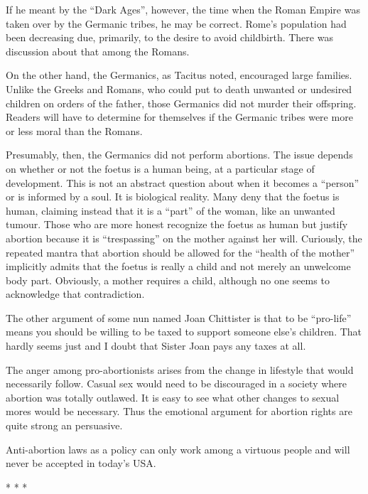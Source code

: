 If he meant by the ``Dark Ages'', however, the time when the Roman Empire was taken over by the Germanic tribes, he may be correct. Rome's population had been decreasing due, primarily, to the desire to avoid childbirth. There was discussion about that among the Romans.

On the other hand, the Germanics, as Tacitus noted, encouraged large families. Unlike the Greeks and Romans, who could put to death unwanted or undesired children on orders of the father, those Germanics did not murder their offspring. Readers will have to determine for themselves if the Germanic tribes were more or less moral than the Romans.

Presumably, then, the Germanics did not perform abortions. The issue depends on whether or not the foetus is a human being, at a particular stage of development. This is not an abstract question about when it becomes a ``person'' or is informed by a soul. It is biological reality. Many deny that the foetus is human, claiming instead that it is a ``part'' of the woman, like an unwanted tumour. Those who are more honest recognize the foetus as human but justify abortion because it is ``trespassing'' on the mother against her will. Curiously, the repeated mantra that abortion should be allowed for the ``health of the mother'' implicitly admits that the foetus is really a child and not merely an unwelcome body part. Obviously, a mother requires a child, although no one seems to acknowledge that contradiction.

The other argument of some nun named Joan Chittister is that to be ``pro-life'' means you should be willing to be taxed to support someone else's children. That hardly seems just and I doubt that Sister Joan pays any taxes at all.

The anger among pro-abortionists arises from the change in lifestyle that would necessarily follow. Casual sex would need to be discouraged in a society where abortion was totally outlawed. It is easy to see what other changes to sexual mores would be necessary. Thus the emotional argument for abortion rights are quite strong an persuasive.

Anti-abortion laws as a policy can only work among a virtuous people and will never be accepted in today's USA.



\begin{center}* * *\end{center}


